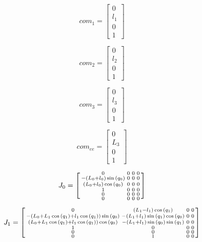 \documentclass{article}
\begin{document}
\begin{equation}
	com_1 = \begin{bmatrix}
 	0\\
 	l_{1}\\
 	0\\
 	1
\end{bmatrix}
\end{equation}

\begin{equation}
	com_2 = \begin{bmatrix}
 	0\\
 	l_{2}\\
 	0\\
 	1
\end{bmatrix}
\end{equation}

\begin{equation}
	com_3 = \begin{bmatrix}
  	0\\
 	l_{3}\\
 	0\\
 	1
\end{bmatrix}
\end{equation}

\begin{equation}
	com_{ee} = \begin{bmatrix}
 	0\\
 	L_{3}\\
 	0\\
 	1
\end{bmatrix}
\end{equation}

\begin{equation}
	J_0 = \begin{bsmallmatrix}
	0 & 0 & 0 & 0\\
	- (L_{0} + l_{0}) \sin{(q_{0} )} & 0 & 0 & 0\\
	(L_{0} + l_{0}) \cos{(q_{0} )} & 0 & 0 & 0\\
	1 & 0 & 0 & 0\\
	0 & 0 & 0 & 0\\
	0 & 0 & 0 & 0
\end{bsmallmatrix}
\end{equation}

\begin{equation}
	J_1 = \begin{bsmallmatrix}
	0 & (L_{1} - l_{1}) \cos{(q_{1} )} & 0 & 0\\
	- (L_{0} + L_{1} \cos{(q_{1} )} + l_{1} \cos{(q_{1} )}) \sin{(q_{0} )} & - (L_{1} + l_{1}) \sin{(q_{1} )} \cos{(q_{0} )} & 0 & 0\\
	(L_{0} + L_{1} \cos{(q_{1} )} + l_{1} \cos{(q_{1} )}) \cos{(q_{0} )} & - (L_{1} + l_{1}) \sin{(q_{0} )} \sin{(q_{1} )} & 0 & 0\\
	1 & 0 & 0 & 0\\
	0 & 0 & 0 & 0\\
	0 & 1 & 0 & 0
\end{bsmallmatrix}
\end{equation}
\end{document}
